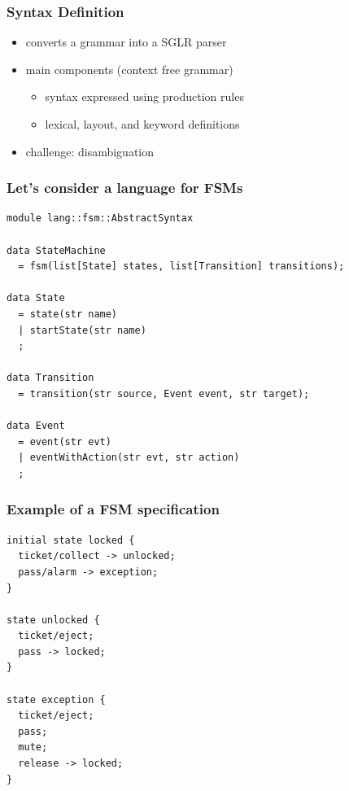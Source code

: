 \documentclass{beamer}
\begin{document}
\begin{frame}
  \frametitle{Syntax Definition}

  \begin{itemize}
  \item converts a grammar into a SGLR parser
  \item main components (context free grammar) 
    \begin{itemize}
    \item syntax expressed using production rules
    \item lexical, layout, and keyword definitions
    \end{itemize} \pause
  \item challenge: disambiguation
  \end{itemize}

\end{frame}

\begin{frame}[fragile]
\frametitle{Let's consider a language for FSMs} 

\begin{lstlisting}[language=Rascal]
module lang::fsm::AbstractSyntax

data StateMachine 
  = fsm(list[State] states, list[Transition] transitions);

data State 
  = state(str name)
  | startState(str name)
  ;
           
data Transition 
  = transition(str source, Event event, str target);
  
data Event 
  = event(str evt)
  | eventWithAction(str evt, str action)
  ;
\end{lstlisting}
\end{frame}

\begin{frame}[fragile]
 \frametitle{Example of a FSM specification}

 \begin{lstlisting}[language=FSM]
initial state locked {
  ticket/collect -> unlocked;
  pass/alarm -> exception;
}

state unlocked {
  ticket/eject;
  pass -> locked;
}

state exception {
  ticket/eject;
  pass;
  mute;
  release -> locked;
}
 \end{lstlisting}
\end{frame}
\end{document}
